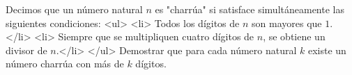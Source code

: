 Decimos que un número natural $n$ es "charrúa" si satisface simultáneamente las siguientes condiciones:
<ul>
  <li> Todos los dígitos de $n$ son mayores que $1$.</li>
  <li> Siempre que se multipliquen cuatro dígitos de $n$, se obtiene un divisor de $n$.</li>
</ul>
Demostrar que para cada número natural $k$ existe un número charrúa con más de $k$ dígitos.
